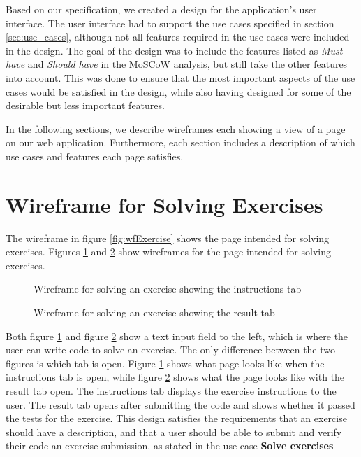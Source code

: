Based on our specification, we created a design for the application's user interface. The user interface had to support the use cases specified in section \ref{sec:use_cases}, although not all features required in the use cases were included in the design. The goal of the design was to include the features listed as \textit{Must have} and \textit{Should have} in the MoSCoW analysis, but still take the other features into account. This was done to ensure that the most important aspects of the use cases would be satisfied in the design, while also having designed for some of the desirable but less important features.

In the following sections, we describe wireframes each showing a view of a page on our web application. Furthermore, each section includes a description of which use cases and features each page satisfies.

\section{Wireframe for Solving Exercises}
The wireframe in figure \ref{fig:wfExercise} shows the page intended for solving exercises.
Figures \ref{fig:wfExerciseInstructions} and \ref{fig:wfExerciseResult} show wireframes for the page intended for solving exercises.

\begin{figure}[H]
	\centering
	\caption{Wireframe for solving an exercise showing the instructions tab}
	\label{fig:wfExerciseInstructions}
\end{figure}

\begin{figure}[H]
	\centering
	\caption{Wireframe for solving an exercise showing the result tab}
	\label{fig:wfExerciseResult}
\end{figure}

Both figure \ref{fig:wfExerciseInstructions} and figure \ref{fig:wfExerciseResult} show a text input field to the left, which is where the user can write code to solve an exercise.
The only difference between the two figures is which tab is open.
Figure \ref{fig:wfExerciseInstructions} shows what page looks like when the instructions tab is open, while figure \ref{fig:wfExerciseResult} shows what the page looks like with the result tab open.
The instructions tab displays the exercise instructions to the user.
The result tab opens after submitting the code and shows whether it passed the tests for the exercise.
This design satisfies the requirements that an exercise should have a description, and that a user should be able to submit and verify their code an exercise submission, as stated in the use case \textbf{Solve exercises}

